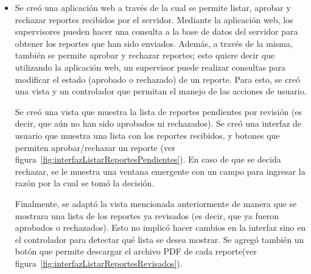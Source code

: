 \begin{itemize}
\item Se creó una aplicación web a través de la cual se permite listar, aprobar y rechazar reportes recibidos por el servidor. Mediante la aplicación web, los supervisores pueden hacer una consulta a la base de datos del servidor para obtener los reportes que han sido enviados. Además, a través de la misma, también se permite aprobar y rechazar reportes; esto quiere decir que utilizando la aplicación web, un supervisor puede realizar consultas para modificar el estado (aprobado o rechazado) de un reporte. Para esto, se creó una vista y un controlador que permitan el manejo de las acciones de usuario. 

Se creó una vista que muestra la lista de reportes pendientes por revisión (es decir, que aún no han sido aprobados ni rechazados). Se creó una interfaz de usuario que muestra una lista con los reportes recibidos, y botones que permiten aprobar/rechazar un reporte (ver figura~\ref{fig:interfazListarReportesPendientes}). En caso de que se decida rechazar, se le muestra una ventana emergente con un campo para ingresar la razón por la cual se tomó la decisión.

Finalmente, se adaptó la vista mencionada anteriormente de manera que se mostrara una lista de los reportes ya revisados (es decir, que ya fueron aprobados o rechazados). Esto no implicó hacer cambios en la interfaz sino en el controlador para detectar qué lista se desea mostrar. Se agregó también un botón que permite descargar el archivo PDF de cada reporte(ver figura~\ref{fig:interfazListarReportesRevisados}).
\end{itemize}
%
%
%
%

